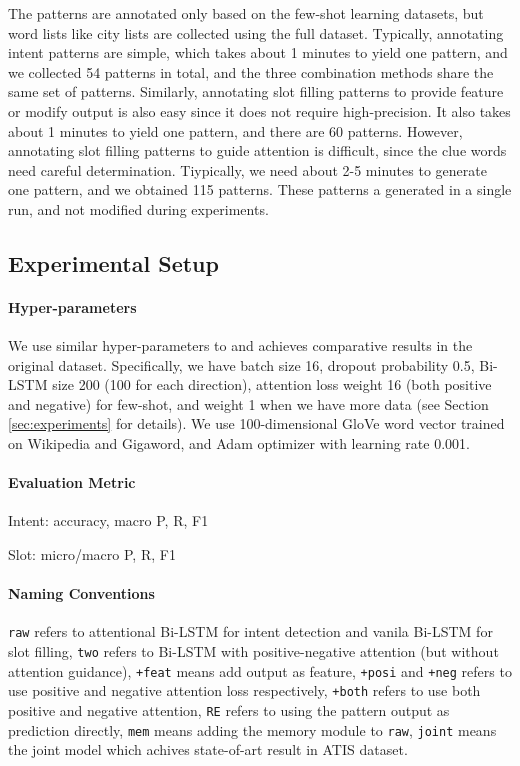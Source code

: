 The \RE patterns are annotated only based on the few-shot learning datasets, but word lists like city lists are collected using the full dataset. Typically, annotating intent patterns are simple, which takes about 1 minutes to yield one pattern, and we collected 54 patterns in total, and the three combination methods share the same set of patterns. Similarly, annotating slot filling patterns to provide feature or modify output is also easy since it does not require high-precision. It also takes about 1 minutes to yield one pattern, and there are 60 patterns. However, annotating slot filling patterns to guide attention is difficult, since the clue words need careful determination. Tiypically, we need about 2-5 minutes to generate one pattern, and we obtained 115 patterns. These patterns a generated in a single run, and not modified during experiments.


\subsection{Experimental Setup}
\paragraph{Hyper-parameters}
We use similar hyper-parameters to \cite{liu2016attention} and achieves comparative results in the original dataset. Specifically, we have batch size 16, dropout probability 0.5, Bi-LSTM size 200 (100 for each direction), attention loss weight 16 (both positive and negative) for few-shot, and weight 1 when we have more data (see Section \ref{sec:experiments} for details). We use 100-dimensional GloVe \cite{pennington2014glove} word vector trained on Wikipedia and Gigaword, and Adam optimizer \cite{kingma2014adam} with learning rate 0.001.

\paragraph{Evaluation Metric}
Intent: accuracy, macro P, R, F1

Slot: micro/macro P, R, F1

\paragraph{Naming Conventions}
\texttt{raw} refers to attentional Bi-LSTM for intent detection and vanila Bi-LSTM for slot filling, \texttt{two} refers to Bi-LSTM with positive-negative attention (but without attention guidance), \texttt{+feat} means add \RE output as feature, \texttt{+posi} and \texttt{+neg} refers to use positive and negative attention loss respectively, \texttt{+both} refers to use both positive and negative attention, \texttt{RE} refers to using the \RE pattern output as prediction directly, \texttt{mem} means adding the memory module \cite{kaiser2017learning} to \texttt{raw}, \texttt{joint} means the joint model \cite{liu2016attention} which achives state-of-art result in ATIS dataset. 




